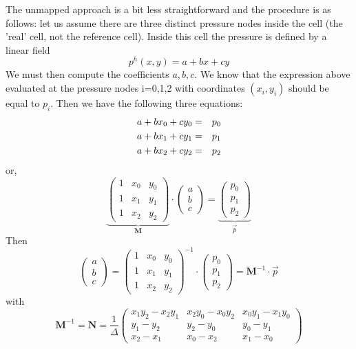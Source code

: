 The unmapped approach is a bit less straightforward and the procedure is as follows:
let us assume there are three distinct pressure nodes inside the cell (the 'real'
cell, not the reference cell).
Inside this cell the pressure is defined by a linear field
\[
p^h(x,y) = a+bx+cy
\]
We must then compute the coefficients $a,b,c$. We know that 
the expression above evaluated at the pressure nodes i=0,1,2 with 
coordinates $(x_i,y_i)$ should be equal to $p_i$. 
Then we have the following three equations:
\begin{eqnarray}
a + bx_0 + cy_0 &=& p_0 \nonumber\\
a + bx_1 + cy_1 &=& p_1 \nonumber\\
a + bx_2 + cy_2 &=& p_2 \nonumber
\end{eqnarray}
or, 
\[
\underbrace{
\left(
\begin{array}{ccc}
1 & x_0 & y_0 \\
1 & x_1 & y_1 \\
1 & x_2 & y_2 
\end{array}
\right)
}_{{\bm M}}
\cdot 
\left(
\begin{array}{ccc}
a \\ b \\ c
\end{array}
\right)
=
\underbrace{
\left(
\begin{array}{ccc}
p_0 \\ p_1 \\ p_2
\end{array}
\right)
}_{\vec{p}}
\]
Then 
\[
\left(
\begin{array}{ccc}
a \\ b \\ c
\end{array}
\right)
=
\left(
\begin{array}{ccc}
1 & x_0 & y_0 \\
1 & x_1 & y_1 \\
1 & x_2 & y_2 
\end{array}
\right)^{-1}
\cdot
\left(
\begin{array}{ccc}
p_0 \\ p_1 \\ p_2
\end{array}
\right)
= {\bm M}^{-1} \cdot \vec{p}
\]
with 
\[
{\bm M}^{-1} 
= {\bm N} 
= \frac{1}{\Delta}
\left(
\begin{array}{ccc}
x_1y_2-x_2y_1 & x_2y_0-x_0y_2 & x_0y_1-x_1y_0 \\
y_1-y_2 & y_2-y_0 & y_0-y_1 \\
x_2-x_1 & x_0-x_2 & x_1-x_0
\end{array}
\right)
\]
